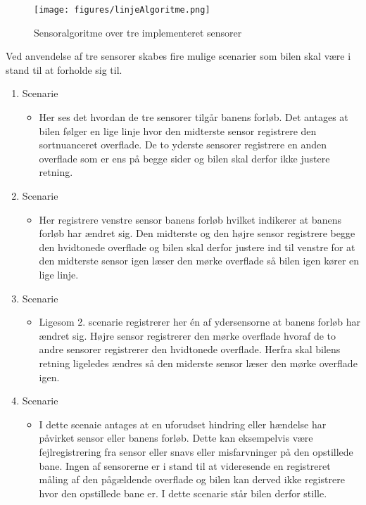 \begin{figure}[h!]
  \centering
  \texttt{[image: figures/linjeAlgoritme.png]}
  \caption{Sensoralgoritme over tre implementeret sensorer}
  \label{line_track}
\end{figure}

Ved anvendelse af tre sensorer skabes fire mulige scenarier som bilen skal være i stand til at forholde sig til.

\begin{enumerate}
   \item Scenarie
   \begin{itemize}
     \item Her ses det hvordan de tre sensorer tilgår banens forløb. Det antages at bilen følger en lige linje hvor den midterste sensor registrere den sortnuanceret overflade. De to yderste sensorer registrere en anden overflade som er ens på begge sider og bilen skal derfor ikke justere retning.
   \end{itemize}
   \item Scenarie
   \begin{itemize}
     \item Her registrere venstre sensor banens forløb hvilket indikerer at banens forløb har ændret sig. Den midterste og den højre sensor registrere begge den hvidtonede overflade og bilen skal derfor justere ind til venstre for at den midterste sensor igen læser den mørke overflade så bilen igen kører en lige linje. 
     \end{itemize}
        \item Scenarie
   \begin{itemize}
     \item Ligesom 2. scenarie registrerer her én af ydersensorne at banens forløb har ændret sig. Højre sensor registrerer den mørke overflade hvoraf de to andre sensorer registrerer den hvidtonede overflade. Herfra skal bilens retning ligeledes ændres så den miderste sensor læser den mørke overflade igen. 
   \end{itemize}
           \item Scenarie
   \begin{itemize}
     \item I dette scenaie antages at en uforudset hindring eller hændelse har påvirket sensor eller banens forløb. Dette kan eksempelvis være fejlregistrering fra sensor eller snavs eller misfarvninger på den opstillede bane. 
     \newline
     Ingen af sensorerne er i stand til at videresende en registreret måling af den pågældende overflade og bilen kan derved ikke registrere hvor den opstillede bane er. I dette scenarie står bilen derfor stille. 
   \end{itemize}
\end{enumerate}

